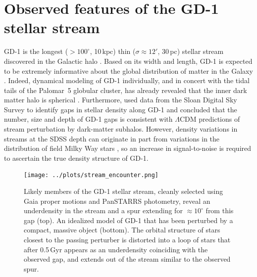 \documentclass[twocolumn]{aastex62}
\begin{document}
\section{Observed features of the GD-1 stellar stream}
\label{sec:data}
GD-1 is the longest ($>100^\circ$, 10\,kpc) thin ($\sigma\approx12'$, 30\,pc) stellar stream discovered in the Galactic halo \citep{gd2006}.
Based on its width and length, GD-1 is expected to be extremely informative about the global distribution of matter in the Galaxy \citep{lux2013, bh2018}.
Indeed, dynamical modeling of GD-1 individually, and in concert with the tidal tails of the Palomar~5 globular cluster, has already revealed that the inner dark matter halo is spherical \citep{koposov2010, bowden2015, bovy2016}.
Furthermore, \citet{cg2013} used data from the Sloan Digital Sky Survey \citep[SDSS,][]{york2000} to identify gaps in stellar density along GD-1 and concluded that the number, size and depth of GD-1 gaps is consistent with $\Lambda$CDM predictions of stream perturbation by dark-matter subhalos.
However, density variations in streams at the SDSS depth can originate in part from variations in the distribution of field Milky Way stars \citep{ibata2016}, so an increase in signal-to-noise is required to ascertain the true density structure of GD-1.

\begin{figure}
\begin{center}
\texttt{[image: ../plots/stream\_encounter.png]}
\end{center}
\caption{Likely members of the GD-1 stellar stream, cleanly selected using Gaia proper motions and PanSTARRS photometry, reveal an underdensity in the stream and a spur extending for $\approx10^\circ$ from this gap (top).
An idealized model of GD-1 that has been perturbed by a compact, massive object (bottom).
The orbital structure of stars closest to the passing perturber is distorted into a loop of stars that after 0.5\,Gyr appears as an underdensity coinciding with the observed gap, and extends out of the stream similar to the observed spur.
}
\label{fig:fiducial}
\end{figure}
\end{document}
